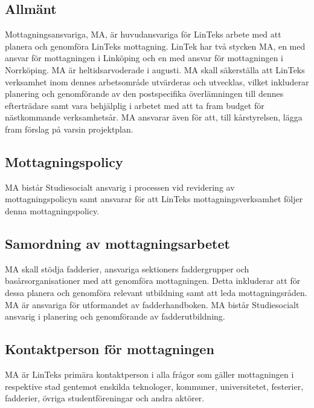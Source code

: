 \hypertarget{allmuxe4nt-9}{%
\subsection{Allmänt}\label{allmuxe4nt-9}}

Mottagningsansvariga, MA, är huvudansvariga för LinTeks arbete med att
planera och genomföra LinTeks mottagning. LinTek har två stycken MA, en
med ansvar för mottagningen i Linköping och en med ansvar för
mottagningen i Norrköping. MA är heltidsarvoderade i augusti. MA skall
säkerställa att LinTeks verksamhet inom dennes arbetsområde utvärderas
och utvecklas, vilket inkluderar planering och genomförande av den
postspecifika överlämningen till dennes efterträdare samt vara
behjälplig i arbetet med att ta fram budget för nästkommande
verksamhetsår. MA ansvarar även för att, till kårstyrelsen, lägga fram
förslag på varsin projektplan.

\hypertarget{mottagningspolicy}{%
\subsection{Mottagningspolicy}\label{mottagningspolicy}}

MA bistår Studiesocialt ansvarig i processen vid revidering av
mottagningspolicyn samt ansvarar för att LinTeks mottagningsverksamhet
följer denna mottagningspolicy.

\hypertarget{samordning-av-mottagningsarbetet}{%
\subsection{Samordning av
mottagningsarbetet}\label{samordning-av-mottagningsarbetet}}

MA skall stödja fadderier, ansvariga sektioners faddergrupper och
basårsorganisationer med att genomföra mottagningen. Detta inkluderar
att för dessa planera och genomföra relevant utbildning samt att leda
mottagningsråden. MA är ansvariga för utformandet av fadderhandboken. MA
bistår Studiesocialt ansvarig i planering och genomförande av
fadderutbildning.

\hypertarget{kontaktperson-fuxf6r-mottagningen}{%
\subsection{Kontaktperson för
mottagningen}\label{kontaktperson-fuxf6r-mottagningen}}

MA är LinTeks primära kontaktperson i alla frågor som gäller
mottagningen i respektive stad gentemot enskilda teknologer, kommuner,
universitetet, festerier, fadderier, övriga studentföreningar och andra
aktörer.

